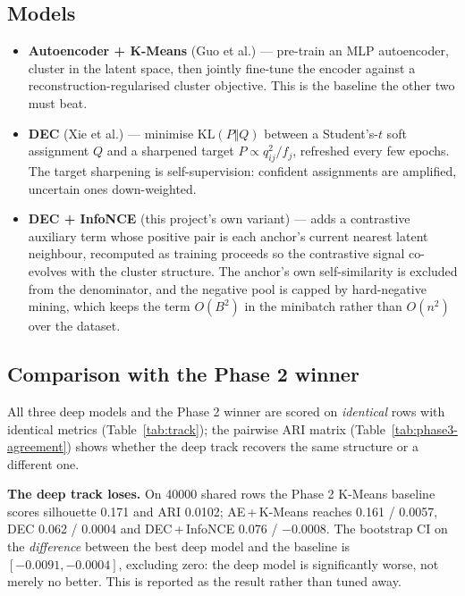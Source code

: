 \documentclass[11pt, a4paper]{article}
\providecommand{\num}[1]{#1}
\begin{document}
\subsection{Models}
\begin{itemize}
  \item \textbf{Autoencoder + K-Means} (Guo et al.) --- pre-train an MLP
        autoencoder, cluster in the latent space, then jointly fine-tune the
        encoder against a reconstruction-regularised cluster objective. This is
        the baseline the other two must beat.
  \item \textbf{DEC} (Xie et al.) --- minimise
        $\mathrm{KL}(P \Vert Q)$ between a Student's-$t$ soft assignment $Q$ and a
        sharpened target $P \propto q_{ij}^2 / f_j$, refreshed every few epochs.
        The target sharpening is self-supervision: confident assignments are
        amplified, uncertain ones down-weighted.
  \item \textbf{DEC + InfoNCE} (this project's own variant) --- adds a
        contrastive auxiliary term whose positive pair is each anchor's current
        nearest latent neighbour, recomputed as training proceeds so the
        contrastive signal co-evolves with the cluster structure. The anchor's
        own self-similarity is excluded from the denominator, and the negative
        pool is capped by hard-negative mining, which keeps the term
        $O(B^2)$ in the minibatch rather than $O(n^2)$ over the dataset.
\end{itemize}

\subsection{Comparison with the Phase 2 winner}
All three deep models and the Phase 2 winner are scored on \emph{identical} rows
with identical metrics (Table~\ref{tab:track}); the pairwise ARI matrix
(Table~\ref{tab:phase3-agreement}) shows whether the deep track recovers the same
structure or a different one.




\textbf{The deep track loses.} On \num{40000} shared rows the Phase 2 K-Means
baseline scores silhouette \num{0.171} and ARI \num{0.0102}; AE\,+\,K-Means
reaches \num{0.161} / \num{0.0057}, DEC \num{0.062} / \num{0.0004} and
DEC\,+\,InfoNCE \num{0.076} / $-\num{0.0008}$. The bootstrap CI on the
\emph{difference} between the best deep model and the baseline is
$[-0.0091, -0.0004]$, excluding zero: the deep model is significantly worse, not
merely no better. This is reported as the result rather than tuned away.
\end{document}

